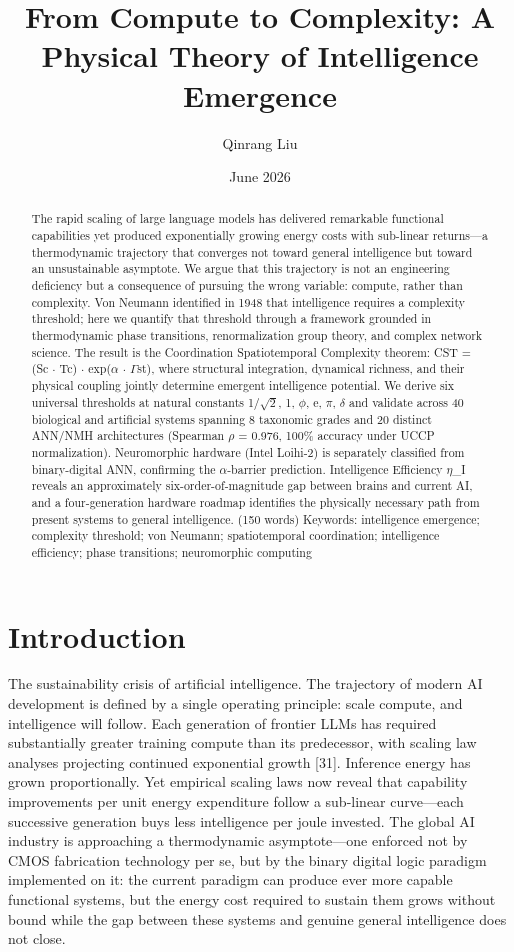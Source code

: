 \documentclass[a4paper,12pt]{article}
\title{From Compute to Complexity: A Physical Theory of Intelligence Emergence}
\author{Qinrang Liu}
\date{June 2026}
\begin{document}
\maketitle

\begin{abstract}
The rapid scaling of large language models has delivered remarkable functional capabilities yet produced exponentially growing energy costs with sub-linear returns---a thermodynamic trajectory that converges not toward general intelligence but toward an unsustainable asymptote. We argue that this trajectory is not an engineering deficiency but a consequence of pursuing the wrong variable: compute, rather than complexity. Von Neumann identified in 1948 that intelligence requires a complexity threshold; here we quantify that threshold through a framework grounded in thermodynamic phase transitions, renormalization group theory, and complex network science. The result is the Coordination Spatiotemporal Complexity theorem: CST = (Sc $\cdot$ Tc) $\cdot$ exp($\alpha$ $\cdot$ $\Gamma$st), where structural integration, dynamical richness, and their physical coupling jointly determine emergent intelligence potential. We derive six universal thresholds at natural constants {1/$\sqrt{2}$, 1, $\phi$, e, $\pi$, $\delta$} and validate across 40 biological and artificial systems spanning 8 taxonomic grades and 20 distinct ANN/NMH architectures (Spearman $\rho$ = 0.976, 100\% accuracy under UCCP normalization). Neuromorphic hardware (Intel Loihi-2) is separately classified from binary-digital ANN, confirming the $\alpha$-barrier prediction. Intelligence Efficiency $\eta$\_I reveals an approximately six-order-of-magnitude gap between brains and current AI, and a four-generation hardware roadmap identifies the physically necessary path from present systems to general intelligence. (150 words) Keywords: intelligence emergence; complexity threshold; von Neumann; spatiotemporal coordination; intelligence efficiency; phase transitions; neuromorphic computing
\end{abstract}

\section{Introduction}

The sustainability crisis of artificial intelligence. The trajectory of modern AI development is defined by a single operating principle: scale compute, and intelligence will follow. Each generation of frontier LLMs has required substantially greater training compute than its predecessor, with scaling law analyses projecting continued exponential growth [31]. Inference energy has grown proportionally. Yet empirical scaling laws now reveal that capability improvements per unit energy expenditure follow a sub-linear curve---each successive generation buys less intelligence per joule invested. The global AI industry is approaching a thermodynamic asymptote---one enforced not by CMOS fabrication technology per se, but by the binary digital logic paradigm implemented on it: the current paradigm can produce ever more capable functional systems, but the energy cost required to sustain them grows without bound while the gap between these systems and genuine general intelligence does not close.
\end{document}
